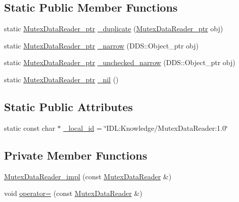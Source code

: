 \subsection*{Static Public Member Functions}
\begin{DoxyCompactItemize}
\item 
static \hyperlink{classKnowledge_1_1MutexDataReader}{MutexDataReader\_\-ptr} \hyperlink{classKnowledge_1_1MutexDataReader_a4eb89e71c4d18a237fcbce2da771d858}{\_\-duplicate} (\hyperlink{classKnowledge_1_1MutexDataReader}{MutexDataReader\_\-ptr} obj)
\item 
static \hyperlink{classKnowledge_1_1MutexDataReader}{MutexDataReader\_\-ptr} \hyperlink{classKnowledge_1_1MutexDataReader_a82be4e0b8d228a5761f27884790130a3}{\_\-narrow} (DDS::Object\_\-ptr obj)
\item 
static \hyperlink{classKnowledge_1_1MutexDataReader}{MutexDataReader\_\-ptr} \hyperlink{classKnowledge_1_1MutexDataReader_a20cd26e7654e33c8920b26875ffbadf8}{\_\-unchecked\_\-narrow} (DDS::Object\_\-ptr obj)
\item 
static \hyperlink{classKnowledge_1_1MutexDataReader}{MutexDataReader\_\-ptr} \hyperlink{classKnowledge_1_1MutexDataReader_ab3c680bc87572213eb934e98b6986ab8}{\_\-nil} ()
\end{DoxyCompactItemize}
\subsection*{Static Public Attributes}
\begin{DoxyCompactItemize}
\item 
static const char $\ast$ \hyperlink{classKnowledge_1_1MutexDataReader_a56c9eccd6ba3fbadffbd33762682479a}{\_\-local\_\-id} = \char`\"{}IDL:Knowledge/MutexDataReader:1.0\char`\"{}
\end{DoxyCompactItemize}
\subsection*{Private Member Functions}
\begin{DoxyCompactItemize}
\item 
\hyperlink{classKnowledge_1_1MutexDataReader__impl_a3ba5c98bfaf59a7a7fc64b8c19ead499}{MutexDataReader\_\-impl} (const \hyperlink{classKnowledge_1_1MutexDataReader}{MutexDataReader} \&)
\item 
void \hyperlink{classKnowledge_1_1MutexDataReader__impl_ae4585a13ae7595e512bdfe399515585f}{operator=} (const \hyperlink{classKnowledge_1_1MutexDataReader}{MutexDataReader} \&)
\end{DoxyCompactItemize}
